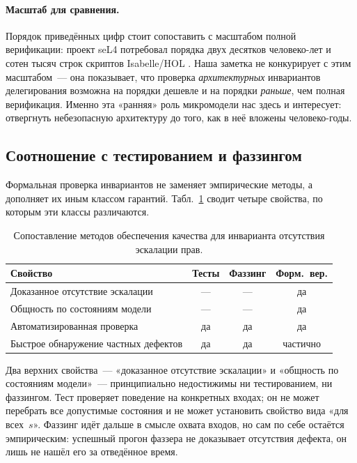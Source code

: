 \documentclass[11pt,a4paper]{article}
\begin{document}
\paragraph{Масштаб для сравнения.}
Порядок приведённых цифр стоит сопоставить с масштабом полной
верификации: проект seL4 потребовал порядка двух десятков
человеко-лет и сотен тысяч строк скриптов Isabelle/HOL
\cite{sel4overview}. Наша заметка не конкурирует с этим масштабом~---
она показывает, что проверка \emph{архитектурных} инвариантов
делегирования возможна на порядки дешевле и на порядки \emph{раньше},
чем полная верификация. Именно эта «ранняя» роль микромодели нас здесь
и интересует: отвергнуть небезопасную архитектуру до того, как в неё
вложены человеко-годы.

\subsection{Соотношение с тестированием и фаззингом}

Формальная проверка инвариантов не заменяет эмпирические методы, а
дополняет их иным классом гарантий. Табл.~\ref{tab:compare} сводит
четыре свойства, по которым эти классы различаются.

\begin{table}[ht]
	\centering
	\caption{Сопоставление методов обеспечения качества для инварианта
		отсутствия эскалации прав.}
	\label{tab:compare}
	\begin{tabular}{@{}lccc@{}}
		\toprule
		\textbf{Свойство}                    &
		\textbf{Тесты}                       &
		\textbf{Фаззинг}                     &
		\textbf{Форм.\ вер.}                                  \\
		\midrule
		Доказанное отсутствие эскалации      &
		---                                  & --- & да       \\
		Общность по состояниям модели        &
		---                                  & --- & да       \\
		Автоматизированная проверка          &
		да                                   & да  & да       \\
		Быстрое обнаружение частных дефектов &
		да                                   & да  & частично \\
		\bottomrule
	\end{tabular}
\end{table}

Два верхних свойства~--- «доказанное отсутствие эскалации» и «общность
по состояниям модели»~--- принципиально недостижимы ни тестированием,
ни фаззингом. Тест проверяет поведение на конкретных входах; он не
может перебрать все допустимые состояния и не может установить
свойство вида «для всех~$s$». Фаззинг идёт дальше в смысле охвата
входов, но сам по себе остаётся эмпирическим: успешный прогон
фаззера не доказывает отсутствия дефекта, он лишь не нашёл его за
отведённое время.
\end{document}
